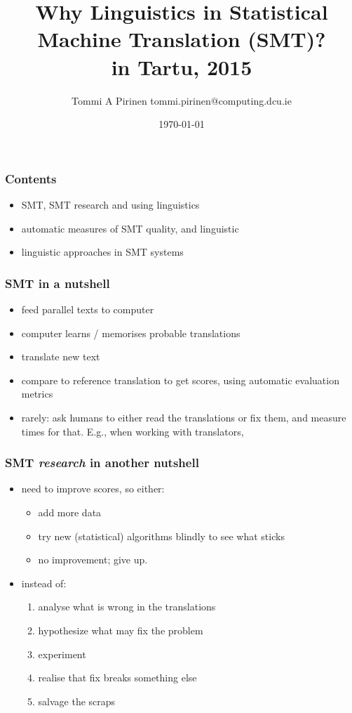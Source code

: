 \documentclass{beamer}
\title{Why Linguistics in Statistical Machine Translation (SMT)?\\
\scriptsize{in Tartu, 2015}}
\author{Tommi A Pirinen \scriptsize \guilsinglleft{}tommi.pirinen@computing.dcu.ie\guilsinglright{}}
\institute{Ollscoil Chathair Bhaile Átha Cliath, ADAPT Centre\\
EU Marie Curie Abu-MaTran project}
\date{\today}
\begin{document}

\maketitle

\begin{frame}
    \frametitle{Contents}
    \begin{itemize}
        \item SMT, SMT research and using linguistics
        \item automatic measures of SMT quality,
            and linguistic
        \item linguistic approaches in SMT systems
    \end{itemize}
\end{frame}


\begin{frame}
    \frametitle{SMT in a nutshell}
    \begin{itemize}
        \item feed parallel texts to computer
        \item computer learns / memorises probable translations
        \item translate new text
        \item compare to reference translation to get scores, using automatic
            evaluation metrics
        \item rarely: ask humans to either read the translations or fix them,
            and measure times for that. E.g., when
            working with translators, 
    \end{itemize}
\end{frame}

\begin{frame}
    \frametitle{SMT \emph{research} in another nutshell}
    \begin{itemize}
        \item need to improve scores, so either:
            \begin{itemize}
                \item add more data
                \item try new (statistical) algorithms blindly to see what sticks
                \item no improvement; give up.
            \end{itemize}
        \item instead of:
            \begin{enumerate}
                \item analyse what is wrong in the translations
                \item hypothesize what may fix the problem
                \item experiment
                \item realise that fix breaks something else
                \item salvage the scraps
            \end{enumerate}
    \end{itemize}
\end{frame}
\end{document}
